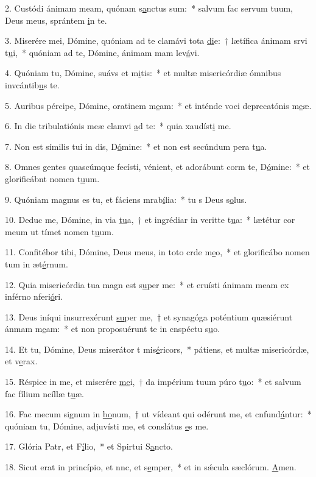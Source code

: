 2. Custódi ánimam meam, quónam s\uline{a}nctus sum:~* salvum fac servum tuum, Deus meus, sprántem \uline{i}n te.\par 
3. Miserére mei, Dómine, quóniam ad te clamávi tota \uline{di}e:~† lætífica ánimam srvi t\uline{u}i,~* quóniam ad te, Dómine, ánimam mam lev\uline{á}vi.\par 
4. Quóniam tu, Dómine, suávs et m\uline{i}tis:~* et multæ misericórdiæ ómnibus invcántib\uline{u}s te.\par 
5. Auribus pércipe, Dómine, oratinem m\uline{e}am:~* et inténde voci deprecatónis m\uline{e}æ.\par 
6. In die tribulatiónis meæ clamvi \uline{a}d te:~* quia xaudíst\uline{i} me.\par 
7. Non est símilis tui in dis, D\uline{ó}mine:~* et non est secúndum pera t\uline{u}a.\par 
8. Omnes gentes quascúmque fecísti, vénient, et adorábunt corm te, D\uline{ó}mine:~* et glorificábnt nomen t\uline{u}um.\par 
9. Quóniam magnus es tu, et fáciens mrab\uline{í}lia:~* tu s Deus s\uline{o}lus.\par 
10. Deduc me, Dómine, in via \uline{tu}a,~† et ingrédiar in veritte t\uline{u}a:~* lætétur cor meum ut tímet nomen t\uline{u}um.\par 
11. Confitébor tibi, Dómine, Deus meus, in toto crde m\uline{e}o,~* et glorificábo nomen tum in æt\uline{é}rnum.\par 
12. Quia misericórdia tua magn est s\uline{u}per me:~* et eruísti ánimam meam ex inférno nferi\uline{ó}ri.\par 
13. Deus iníqui insurrexérunt \uline{su}per me,~† et synagóga poténtium quæsiérunt ánmam m\uline{e}am:~* et non proposuérunt te in cnspéctu s\uline{u}o.\par 
14. Et tu, Dómine, Deus miserátor t mis\uline{é}ricors,~* pátiens, et multæ misericórdæ, et v\uline{e}rax.\par 
15. Réspice in me, et miserére \uline{me}i,~† da impérium tuum púro t\uline{u}o:~* et salvum fac fílium ncíllæ t\uline{u}æ.\par 
16. Fac mecum signum in \uline{bo}num,~† ut vídeant qui odérunt me, et cnfund\uline{á}ntur:~* quóniam tu, Dómine, adjuvísti me, et conslátus \uline{e}s me.\par 
17. Glória Patr, et F\uline{í}lio,~* et Spirtui S\uline{a}ncto.\par 
18. Sicut erat in princípio, et nnc, et s\uline{e}mper,~* et in sǽcula sæclórum. \uline{A}men.\par 
